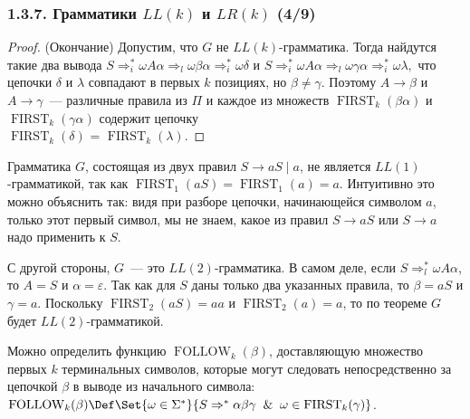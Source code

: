 \begin{frame}
\frametitle{1.3.7. Грамматики $LL(k)$ и $LR(k)$ (4/9)}
\begin{proof} (Окончание)
Допустим, что \( G \) не $LL(k)$-грамматика. Тогда найдутся такие два вывода 
\(
S \Rightarrow_i^* \omega A\alpha \Rightarrow_l \omega \beta \alpha \Rightarrow_i^* \omega \delta
\)
и
\(
S \Rightarrow_i^* \omega A\alpha \Rightarrow_l \omega \gamma \alpha \Rightarrow_i^* \omega \lambda,
\)
что цепочки \( \delta \) и \( \lambda \) совпадают в первых \( k \) позициях, но \( \beta \neq \gamma \). Поэтому \( A \to \beta \) и \( A \to \gamma \)~---
 различные правила из \( \Pi \) и каждое из множеств \( \operatorname{FIRST}_k(\beta \alpha) \) и \( \operatorname{FIRST}_k(\gamma \alpha) \) содержит цепочку\\ \( \operatorname{FIRST}_k(\delta) \) = \( \operatorname{FIRST}_k(\lambda) \).
\end{proof}


\begin{example} Грамматика $G$, состоящая из двух правил $S \to aS \mid a$, 
не является $LL(1)$-грамматикой, 
так как $\operatorname{FIRST}_1(aS) = \operatorname{FIRST}_1(a) = a$. 
Интуитивно это можно объяснить так: видя при разборе цепочки, начинающейся символом $a$, только этот первый символ, мы не знаем, какое из правил $S \to aS$ или $S \to a$ надо применить к $S$.

С другой стороны, $G$~--- это $LL(2)$-грамматика. В самом деле, если $S \Rightarrow^*_l \omega A\alpha$, то $A = S$ и $\alpha = \varepsilon$. Так как для $S$ даны только два указанных правила, то $\beta = aS$ и $\gamma = a$. Поскольку $\operatorname{FIRST}_2(aS) = aa$ и $\operatorname{FIRST}_2(a) = a$, то по теореме $G$ будет $LL(2)$-грамматикой.
\end{example} 

\begin{digress} Можно определить функцию 
$\operatorname{FOLLOW}_k(\beta)$, доставляющую
множество первых $k$ терминальных символов, которые могут следовать непосредственно за цепочкой $\beta$ в выводе из начального символа:
$
\operatorname{FOLLOW}_k(\beta) \Def \Set{\omega\in \Sigma^*}{ S \Rightarrow^*
 \alpha \beta \gamma \And \omega \in \operatorname{FIRST}_k(\gamma) }
$.
\end{digress}


\end{frame}

